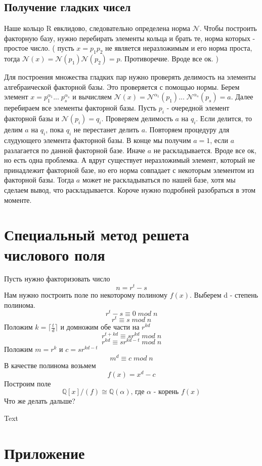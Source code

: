 \documentclass[oneside,final,14pt]{extreport}
\theoremstyle{plain}
\begin{document}
\section{Получение гладких чисел}
Наше кольцо R евклидово, следовательно определена норма $\mathcal{N}$.
Чтобы построить факторную базу, нужно перебирать элементы кольца и брать те, норма которых - простое число. ( пусть $x=p_1p_2$ не является неразложимым и его норма проста, тогда $\mathcal{N}(x)=
\mathcal{N}(p_1)\mathcal{N}(p_2)=p$. Противоречие. Вроде все ок. )

Для построения множества гладких пар нужно проверять делимость на элементы алгебраической факторной базы. Это проверяется с помощью нормы. Берем элемент $x=p_1^{\alpha_1}...\;p_s^{\alpha_s}$ и вычисляем $\mathcal{N}(x)=\mathcal{N}^{\alpha_1}(p_1)...\;\mathcal{N}^{\alpha_s}(p_s)=a$. Далее перебираем все элементы факторной базы. Пусть $p_i$ - очередной элемент факторной базы и $\mathcal{N}(p_i)=q_i$. Проверяем делимость $a$ на $q_i$. Если делится, то делим $a$ на $q_i$, пока $q_i$ не перестанет делить $a$.
Повторяем процедуру для слудующего элемента факторной базы. В конце мы получим $a=1$, если $a$ разлагается по данной факторной базе. Иначе $a$ не раскладывается. Вроде все ок, но есть одна проблемка. А вдруг существует неразложимый элемент, который не принадлежит факторной базе, но его норма совпадает с некоторым элементом из факторной базы. Тогда $a$ может не раскладываться по нашей базе, хотя мы сделаем вывод, что раскладывается. Короче нужно подробней разобраться в этом моменте. 

\chapter{Специальный метод решета числового поля}
Пусть нужно факторизовать число $$n=r^t-s$$
Нам нужно построить поле по некоторому полиному $f(x)$. Выберем d - степень полинома.
$$r^t-s\equiv0 \; mod \; n$$
$$r^t\equiv s \; mod \; n$$
Положим $k=\lceil\frac{t}{d}\rceil$ и домножим обе части на $r^{kd}$
$$r^{t+kd}\equiv sr^{kd} \; mod \; n$$
$$r^{kd}\equiv sr^{kd-t} \; mod \; n$$
Положим $m=r^{k}$ и $c=sr^{kd-t}$
$$m^{d}\equiv c \; mod \; n$$
В качестве полинома возьмем
$$f(x)=x^d-c$$
Построим поле
$${\mathbb{Q}[x]}/{(f)} \cong \mathbb{Q}(\alpha)\text{, где $\alpha$ - корень $f(x)$}$$
Что же делать дальше?







\begin{thebibliography}{0}




 Text







\end{thebibliography}
\appendix
\chapter{Приложение}\label{AppendixA}
\end{document}

